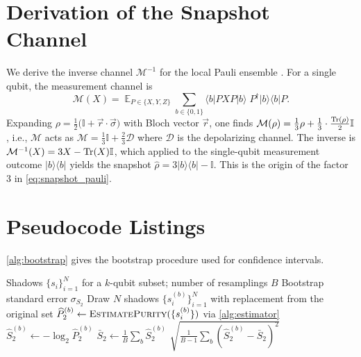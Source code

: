 \documentclass[12pt,a4paper,oneside]{book}
\theoremstyle{plain}
\theoremstyle{definition}
\theoremstyle{remark}
\DeclareMathOperator{\E}{\mathbb{E}}
\begin{document}
\chapter{Derivation of the Snapshot Channel}
\label{app:snapshot}

We derive the inverse channel $\mathcal{M}^{-1}$ for the local Pauli ensemble \cite{huang2020predicting}. For a single qubit, the measurement channel is
\begin{equation}
    \mathcal{M}(X) = \E_{P \in \{X,Y,Z\}} \sum_{b \in \{0,1\}} \langle b| P X P |b\rangle \; P^\dagger |b\rangle\langle b| P.
\end{equation}
Expanding $\rho = \frac12\bigl(\mathbb{I} + \vec{r} \cdot \vec{\sigma}\bigr)$ with Bloch vector $\vec{r}$, one finds $\mathcal{M}(\rho) = \frac13 \rho + \frac13 \cdot \frac{\Tr(\rho)}{2} \mathbb{I}$, i.e., $\mathcal{M}$ acts as $\mathcal{M} = \frac13 \mathbb{I} + \frac23 \mathcal{D}$ where $\mathcal{D}$ is the depolarizing channel. The inverse is $\mathcal{M}^{-1}(X) = 3X - \Tr(X)\mathbb{I}$, which applied to the single-qubit measurement outcome $|b\rangle\langle b|$ yields the snapshot $\hat{\rho} = 3|b\rangle\langle b| - \mathbb{I}$. This is the origin of the factor $3$ in \cref{eq:snapshot_pauli}.

\chapter{Pseudocode Listings}
\label{app:pseudocode}

\cref{alg:bootstrap} gives the bootstrap procedure used for confidence intervals.

\begin{algorithm}[H]
\caption{Bootstrap standard error for $\widehat{S}_2$}\label{alg:bootstrap}
\begin{algorithmic}[1]
\Require Shadows $\{s_i\}_{i=1}^{N}$ for a $k$-qubit subset; number of resamplings $B$
\Ensure Bootstrap standard error $\sigma_{S_2}$
    \State Draw $N$ shadows $\{s^{(b)}_i\}_{i=1}^{N}$ with replacement from the original set
    \State $\widehat{P}_2^{(b)} \gets \textsc{EstimatePurity}(\{s^{(b)}_i\})$ via \cref{alg:estimator}
    \State $\widehat{S}_2^{(b)} \gets -\log_2 \widehat{P}_2^{(b)}$
\EndFor
\State $\bar{S}_2 \gets \frac{1}{B} \sum_b \widehat{S}_2^{(b)}$
\State \Return $\sqrt{\frac{1}{B-1} \sum_b (\widehat{S}_2^{(b)} - \bar{S}_2)^2}$
\end{algorithmic}
\end{algorithm}
\end{document}
